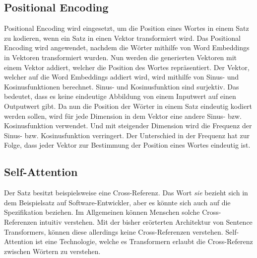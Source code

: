 \subsection{Positional Encoding}
\label{chap:positional-encoding}
Positional Encoding wird eingesetzt, um die Position eines Wortes in einem Satz zu kodieren, wenn ein Satz in einen Vektor transformiert wird.
Das Positional Encoding wird angewendet, nachdem die Wörter mithilfe von Word Embeddings in Vektoren transformiert wurden.
Nun werden die generierten Vektoren mit einem Vektor addiert, welcher die Position des Wortes repräsentiert.
Der Vektor, welcher auf die Word Embeddings addiert wird, wird mithilfe von Sinus- und Kosinusfunktionen berechnet.
Sinus- und Kosinusfunktion sind surjektiv.
Das bedeutet, dass es keine eindeutige Abbildung von einem Inputwert auf einen Outputwert gibt.
Da nun die Position der Wörter in einem Satz eindeutig kodiert werden sollen, wird für jede Dimension in dem Vektor eine andere Sinus- bzw. Kosinusfunktion verwendet.
Und mit steigender Dimension wird die Frequenz der Sinus- bzw. Kosinusfunktion verringert.
Der Unterschied in der Frequenz hat zur Folge, dass jeder Vektor zur Bestimmung der Position eines Wortes eindeutig ist.

\subsection{Self-Attention}
Der Satz  besitzt beispielsweise eine Cross-Referenz.
Das Wort \textit{sie} bezieht sich in dem Beispielsatz auf Software-Entwickler, aber es könnte sich auch auf die Spezifikation beziehen.
Im Allgemeinen können Menschen solche Cross-Referenzen intuitiv verstehen.
Mit der bisher erörterten Architektur von Sentence Transformers, können diese allerdings keine Cross-Referenzen verstehen.
Self-Attention ist eine Technologie, welche es Transformern erlaubt die Cross-Referenz zwischen Wörtern zu verstehen.\\

